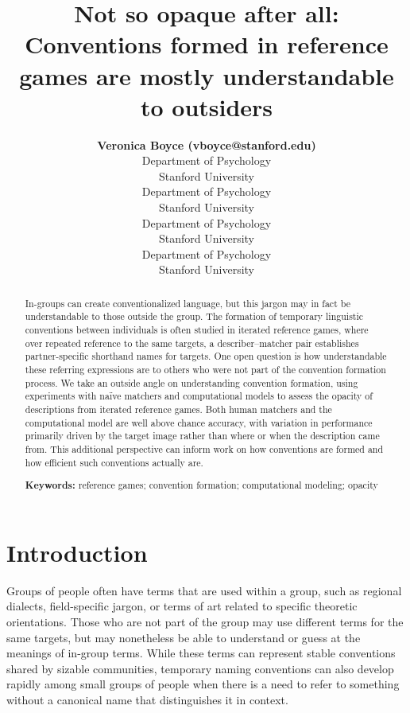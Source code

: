 \documentclass[10pt, letterpaper]{article}
\title{Not so opaque after all: Conventions formed in reference games
are mostly understandable to outsiders}
\author{{\large \bf Veronica Boyce (vboyce@stanford.edu)} \\ Department of Psychology \\ Stanford University \And {\large \bf Ben Prystawski (benpry@stanford.edu)} \\Department of Psychology \\ Stanford University \AND {\large \bf Alvin Wei Ming Tan (tanawm@stanford.edu)} \\ Department of Psychology \\ Stanford University \And {\large \bf Michael C. Frank (mcfrank@stanford.edu)} \\ Department of Psychology \\ Stanford University}
\begin{document}
\maketitle

\begin{abstract}
In-groups can create conventionalized language, but this jargon may in
fact be understandable to those outside the group. The formation of
temporary linguistic conventions between individuals is often studied in
iterated reference games, where over repeated reference to the same
targets, a describer--matcher pair establishes partner-specific
shorthand names for targets. One open question is how understandable
these referring expressions are to others who were not part of the
convention formation process. We take an outside angle on understanding
convention formation, using experiments with naïve matchers and
computational models to assess the opacity of descriptions from iterated
reference games. Both human matchers and the computational model are
well above chance accuracy, with variation in performance primarily
driven by the target image rather than where or when the description
came from. This additional perspective can inform work on how
conventions are formed and how efficient such conventions actually are.

\textbf{Keywords:}
reference games; convention formation; computational modeling; opacity
\end{abstract}

\section{Introduction}\label{introduction}

Groups of people often have terms that are used within a group, such as
regional dialects, field-specific jargon, or terms of art related to
specific theoretic orientations. Those who are not part of the group may
use different terms for the same targets, but may nonetheless be able to
understand or guess at the meanings of in-group terms. While these terms
can represent stable conventions shared by sizable communities,
temporary naming conventions can also develop rapidly among small groups
of people when there is a need to refer to something without a canonical
name that distinguishes it in context.
\end{document}
